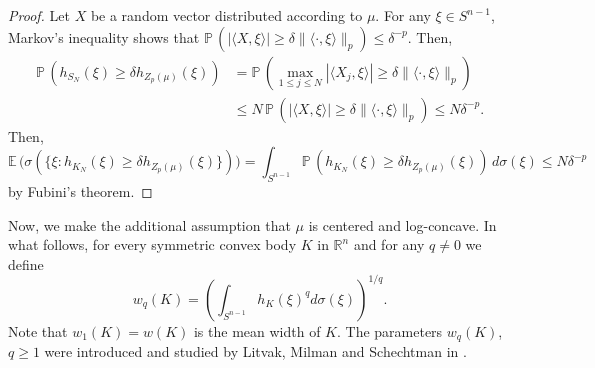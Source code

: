 \documentclass[11pt,leqno]{article}
\theoremstyle{definition}
\theoremstyle{remark}
\numberwithin{equation}{section}
\newcommand{\ls}{\leqslant}
\newcommand{\gr}{\geqslant}
\newcommand{\1}{\textbf{1}}
\begin{document}
\begin{proof}Let $X$ be a random vector distributed according to $\mu$.
For any $\xi\in S^{n-1}$, Markov's inequality shows that ${\mathbb P}\,(|\langle X,\xi\rangle |\gr\delta
\|\langle \cdot ,\xi\rangle\|_p)\ls \delta^{-p}$. Then,
\begin{align*}{\mathbb P}\,(h_{S_N}(\xi )\gr \delta h_{Z_p(\mu )}(\xi
)) &={\mathbb P}\,(\max_{1\ls j\ls N}|\langle X_j,\xi \rangle
|\gr\delta\|\langle \cdot ,\xi\rangle\|_p)\\
\nonumber &\ls N\,{\mathbb P}\,(|\langle X,\xi\rangle |\gr\delta
\|\langle \cdot ,\xi\rangle\|_p)\ls N\delta^{-p}.\end{align*}
Then,
\begin{equation*}{\mathbb E}\,\Big(\sigma (\{\xi : h_{K_N}(\xi )\gr \delta h_{Z_p(\mu )}(\xi
)\})\Big)=\int_{S^{n-1}}{\mathbb P}\,(h_{K_N}(\xi )\gr \delta
h_{Z_p(\mu )}(\xi ))\,d\sigma (\xi )\ls N\delta^{-p}\end{equation*} by
Fubini's theorem. \end{proof}



Now, we make the additional assumption that $\mu$ is centered and log-concave. In what follows,
for every symmetric convex body $K$ in $\mathbb{R}^n$ and for any $q\neq 0$ we define
\begin{equation*}w_q(K)=\left (\int_{S^{n-1}}h_K(\xi)^qd\sigma (\xi)\right )^{1/q}.
\end{equation*} Note that $w_1(K)=w(K)$ is the mean width of $K$. The parameters $w_q(K)$, $q\gr 1$
were introduced and studied by Litvak, Milman and Schechtman in \cite{Litvak-VMilman-Schechtman-1998}.
\end{document}
